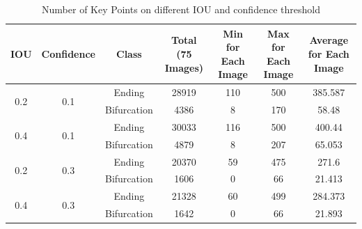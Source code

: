 \begin{table}[h]
    \centering
    \caption{Number of Key Points on different IOU and confidence threshold}
    \begin{tabular}{ccccccc}
    \hline
    IOU                  & Confidence           & Class       & Total (75 Images) & Min for Each Image & Max for Each Image & Average for Each Image \\ \hline
    \multirow{2}{*}{0.2} & \multirow{2}{*}{0.1} & Ending      & 28919             & 110                & 500                & 385.587                \\
                         &                      & Bifurcation & 4386              & 8                 & 170                & 58.48                 \\ \hline
    \multirow{2}{*}{0.4} & \multirow{2}{*}{0.1} & Ending      & 30033             & 116                 & 500                & 400.44                \\
                         &                      & Bifurcation & 4879              & 8                  & 207                & 65.053                  \\ \hline
    \multirow{2}{*}{0.2} & \multirow{2}{*}{0.3} & Ending      & 20370             & 59                & 475                & 271.6                 \\
                         &                      & Bifurcation & 1606              & 0                 & 66                & 21.413                 \\ \hline
    \multirow{2}{*}{0.4} & \multirow{2}{*}{0.3} & Ending      & 21328             & 60                 & 499                & 284.373                \\
                         &                      & Bifurcation & 1642              & 0                  & 66                & 21.893                   \\ \hline
    \end{tabular}
    \label{iou-conf}
\end{table}


